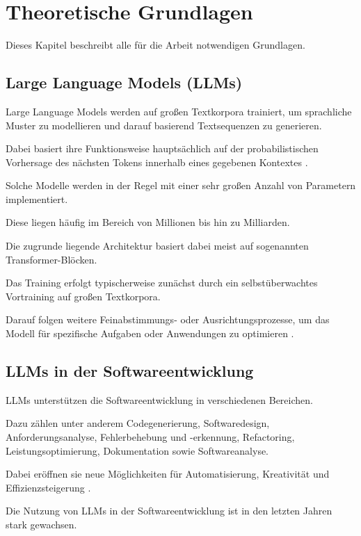 
\chapter{Theoretische Grundlagen}
\label{chapter-basics}

Dieses Kapitel beschreibt alle für die Arbeit notwendigen Grundlagen.

\section{Large Language Models (LLMs)}

Large Language Models werden auf großen Textkorpora
trainiert, um sprachliche Muster zu modellieren und
darauf basierend Textsequenzen zu generieren.

Dabei basiert ihre Funktionsweise hauptsächlich auf der
probabilistischen Vorhersage des nächsten Tokens
innerhalb eines gegebenen Kontextes \cite{seemann2023ki}.

Solche Modelle werden in der Regel mit einer sehr
großen Anzahl von Parametern implementiert.

Diese liegen häufig im Bereich von Millionen bis hin zu
Milliarden.

Die zugrunde liegende Architektur basiert dabei meist
auf sogenannten Transformer-Blöcken.

Das Training erfolgt typischerweise zunächst durch ein
selbstüberwachtes Vortraining auf großen Textkorpora.

Darauf folgen weitere Feinabstimmungs- oder
Ausrichtungsprozesse, um das Modell für spezifische
Aufgaben oder Anwendungen zu optimieren
\cite{zhang2023survey}.

\section{LLMs in der Softwareentwicklung}

LLMs unterstützen die Softwareentwicklung in
verschiedenen Bereichen.

Dazu zählen unter anderem Codegenerierung,
Softwaredesign, Anforderungsanalyse,
Fehlerbehebung und -erkennung, Refactoring,
Leistungsoptimierung, Dokumentation sowie
Softwareanalyse.

Dabei eröffnen sie neue Möglichkeiten für
Automatisierung, Kreativität und Effizienzsteigerung
\cite{LLMinSEreviewandvision}.

Die Nutzung von LLMs in der Softwareentwicklung ist in
den letzten Jahren stark gewachsen.

